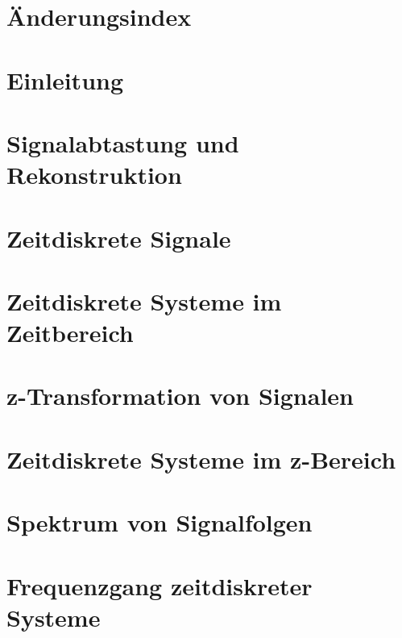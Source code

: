 

\thispagestyle{empty} %

\newpage

\thispagestyle{empty}
\section*{Änderungsindex}

\newpage
{}
\thispagestyle{empty}
\tableofcontents

\newpage

\thispagestyle{empty} %
\mbox{}


\section{Einleitung}


\clearpage

\section{Signalabtastung und Rekonstruktion}\label{two}


\clearpage

\section{Zeitdiskrete Signale}


\clearpage

\section{Zeitdiskrete Systeme im Zeitbereich}\label{four}


\clearpage

\section{z-Transformation von Signalen}


\clearpage

\section{Zeitdiskrete Systeme im z-Bereich}\label{six}


\clearpage

\section{Spektrum von Signalfolgen}


\clearpage

\section{Frequenzgang zeitdiskreter Systeme}




